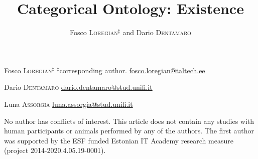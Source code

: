 \documentclass[a4paper,9pt]{../birkjour}
\title{Categorical Ontology: Existence}
\author{Fosco \textsc{Loregian}$^\ddag$ and Dario \textsc{Dentamaro}}
\begin{document}
\scriptsize

\maketitle

\begin{center}
\begin{minipage}{.32\textwidth}
  Fosco \textsc{Loregian}$^\ddag$\newline
  $^\ddag$corresponding author. \newline
\url{fosco.loregian@taltech.ee}
\end{minipage}\hfill %
\begin{minipage}{.32\textwidth}
  Dario \textsc{Dentamaro} \newline
  \url{dario.dentamaro@stud.unifi.it}
\end{minipage}\hfill %
\begin{minipage}{.32\textwidth}
  Luna \textsc{Assorgia} \newline
  \url{luna.assorgia@stud.unifi.it}
\end{minipage}
\end{center}

\vspace*{\fill}%
\normalsize
No author has conflicts of interest. This article does not contain any studies with human participants or animals performed by any of the authors. The first author was supported by the ESF funded Estonian IT Academy research measure (project 2014-2020.4.05.19-0001).
\end{document}
